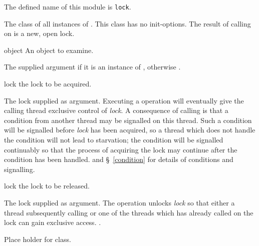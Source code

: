 \begin{optDefinition}
\label{lock}
\gdef\module{lock}
The defined name of this module is {\tt lock}.

%
The class of all instances of .  This class has no
init-options.  The result of calling  on 
is a new, open lock.

%
\begin{arguments}
    \item[object] An object to examine.
\end{arguments}
%
\result%
The supplied argument if it is an instance of ,
otherwise \nil{}.

%
\begin{arguments}
    \item[lock] the lock to be acquired.
\end{arguments}
%
\result%
The lock supplied as argument.
%
\remarks%
Executing a  operation will eventually give the calling thread
exclusive control of {\em lock}.  A consequence of calling  is
that a condition from another thread may be signalled on this thread.  Such a
condition will be signalled before {\em lock} has been acquired, so a thread
which does not handle the condition will not lead to starvation; the condition
will be signalled continuably so that the process of acquiring the lock may
continue after the condition has been handled.
%
\seealso%
 and \S~\ref{condition} for details of conditions and
signalling.

%
\begin{arguments}
    \item[lock] the lock to be released.
\end{arguments}
%
\result%
The lock supplied as argument.
%
\remarks%
The  operation unlocks {\em lock} so that either a thread
subsequently calling  or one of the threads which has already
called  on the lock can gain exclusive access.
%
\seealso%
.

%
Place holder for  class.

\end{optDefinition}

